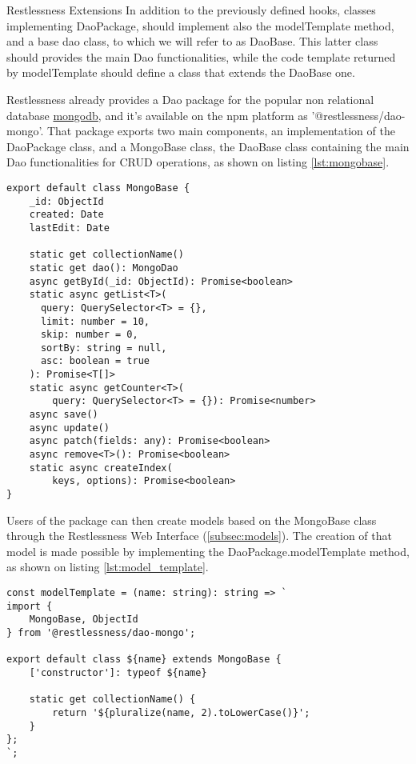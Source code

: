 \begin{chapter}{Restlessness Extensions}
    In addition to the previously defined hooks, classes implementing DaoPackage,
    should implement also the modelTemplate method, and a base dao class, to which
    we will refer to as DaoBase. This latter class should provides the main Dao
    functionalities, while the code template returned by modelTemplate should define
    a class that extends the DaoBase one.

    Restlessness already provides a Dao package for the popular non relational
    database \href{https://www.mongodb.com/}{mongodb}, and it's available on the
    npm platform as '@restlessness/dao-mongo'.
    That package exports two main components, an implementation of the DaoPackage
    class, and a MongoBase class, the DaoBase class containing the main Dao
    functionalities for CRUD operations, as shown on listing \ref{lst:mongobase}.

    \begin{lstlisting}[caption=MongoBase class definition, label={lst:mongobase}]
export default class MongoBase {
    _id: ObjectId
    created: Date
    lastEdit: Date

    static get collectionName()
    static get dao(): MongoDao
    async getById(_id: ObjectId): Promise<boolean>
    static async getList<T>(
      query: QuerySelector<T> = {},
      limit: number = 10,
      skip: number = 0,
      sortBy: string = null,
      asc: boolean = true
    ): Promise<T[]>
    static async getCounter<T>(
        query: QuerySelector<T> = {}): Promise<number>
    async save()
    async update()
    async patch(fields: any): Promise<boolean>
    async remove<T>(): Promise<boolean>
    static async createIndex(
        keys, options): Promise<boolean>
}
    \end{lstlisting}

    Users of the package can then create models based on the MongoBase class through
    the Restlessness Web Interface (\ref{subsec:models}).
    The creation of that model is made possible by implementing the DaoPackage.modelTemplate
    method, as shown on listing \ref{lst:model_template}.

    \begin{lstlisting}[caption=modelTemplate function definition, label={lst:model_template}]
const modelTemplate = (name: string): string => `
import {
    MongoBase, ObjectId
} from '@restlessness/dao-mongo';

export default class ${name} extends MongoBase {
    ['constructor']: typeof ${name}

    static get collectionName() {
        return '${pluralize(name, 2).toLowerCase()}';
    }
};
`;
    \end{lstlisting}


\end{chapter}
